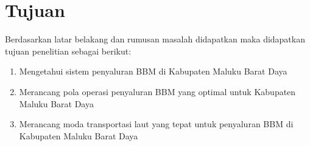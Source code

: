 \section{Tujuan}
\label{sec:Tujuan}

Berdasarkan latar belakang dan rumusan masalah didapatkan maka didapatkan tujuan penelitian sebagai berikut:
\begin{enumerate}
  \item Mengetahui sistem penyaluran BBM di Kabupaten Maluku Barat Daya
  \item Merancang pola operasi penyaluran BBM yang optimal untuk Kabupaten Maluku Barat Daya
  \item Merancang moda transportasi laut yang tepat untuk penyaluran BBM di Kabupaten Maluku Barat Daya
\end{enumerate}
